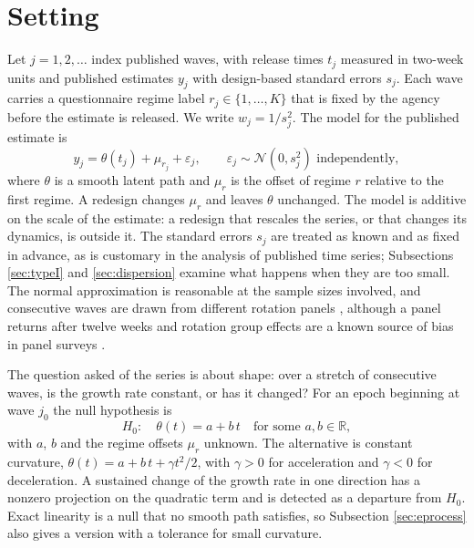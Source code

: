 \documentclass[Afour,sageh,times]{sagej}
\theoremstyle{definition}
\begin{document}
\section{Setting}
\label{sec:setting}

Let $j = 1, 2, \dots$ index published waves, with release times $t_j$ measured in two-week units and published estimates $y_j$ with design-based standard errors $s_j$. Each wave carries a questionnaire regime label $r_j \in \{1, \dots, K\}$ that is fixed by the agency before the estimate is released. We write $w_j = 1/s_j^2$. The model for the published estimate is
\begin{equation}
y_j = \theta(t_j) + \mu_{r_j} + \varepsilon_j, \qquad \varepsilon_j \sim \mathcal{N}(0, s_j^2) \text{ independently},
\label{eq:model}
\end{equation}
where $\theta$ is a smooth latent path and $\mu_r$ is the offset of regime $r$ relative to the first regime. A redesign changes $\mu_r$ and leaves $\theta$ unchanged. The model is additive on the scale of the estimate: a redesign that rescales the series, or that changes its dynamics, is outside it. The standard errors $s_j$ are treated as known and as fixed in advance, as is customary in the analysis of published time series; Subsections \ref{sec:typeI} and \ref{sec:dispersion} examine what happens when they are too small. The normal approximation is reasonable at the sample sizes involved, and consecutive waves are drawn from different rotation panels \citep{censusmethod2025}, although a panel returns after twelve weeks and rotation group effects are a known source of bias in panel surveys \citep{bailar1975}.

The question asked of the series is about shape: over a stretch of consecutive waves, is the growth rate constant, or has it changed? For an epoch beginning at wave $j_0$ the null hypothesis is
\begin{equation}
H_0:\quad \theta(t) = a + b\,t \quad \text{for some } a, b \in \mathbb{R},
\label{eq:null}
\end{equation}
with $a$, $b$ and the regime offsets $\mu_r$ unknown. The alternative is constant curvature, $\theta(t) = a + b\,t + \gamma t^2/2$, with $\gamma > 0$ for acceleration and $\gamma < 0$ for deceleration. A sustained change of the growth rate in one direction has a nonzero projection on the quadratic term and is detected as a departure from $H_0$. Exact linearity is a null that no smooth path satisfies, so Subsection \ref{sec:eprocess} also gives a version with a tolerance for small curvature.
\end{document}
